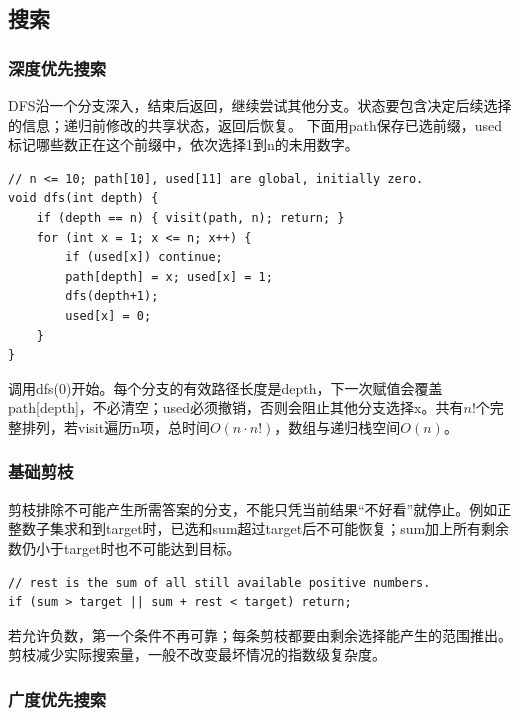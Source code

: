 \documentclass[UTF8,11pt,a4paper,fontset=none]{ctexart}
\begin{document}
\subsection{搜索}
\subsubsection{深度优先搜索}
DFS沿一个分支深入，结束后返回，继续尝试其他分支。状态要包含决定后续选择的信息；递归前修改的共享状态，返回后恢复。
下面用path保存已选前缀，used标记哪些数正在这个前缀中，依次选择1到n的未用数字。
\par\noindent\begin{minipage}{\linewidth}
\begin{lstlisting}
// n <= 10; path[10], used[11] are global, initially zero.
void dfs(int depth) {
    if (depth == n) { visit(path, n); return; }
    for (int x = 1; x <= n; x++) {
        if (used[x]) continue;
        path[depth] = x; used[x] = 1;
        dfs(depth+1);
        used[x] = 0;
    }
}
\end{lstlisting}
\end{minipage}\par
调用dfs(0)开始。每个分支的有效路径长度是depth，下一次赋值会覆盖path[depth]，不必清空；used必须撤销，否则会阻止其他分支选择x。共有$n!$个完整排列，若visit遍历n项，总时间$O(n\cdot n!)$，数组与递归栈空间$O(n)$。
\subsubsection{基础剪枝}
剪枝排除不可能产生所需答案的分支，不能只凭当前结果“不好看”就停止。例如正整数子集求和到target时，已选和sum超过target后不可能恢复；sum加上所有剩余数仍小于target时也不可能达到目标。
\par\noindent\begin{minipage}{\linewidth}
\begin{lstlisting}
// rest is the sum of all still available positive numbers.
if (sum > target || sum + rest < target) return;
\end{lstlisting}
\end{minipage}\par
若允许负数，第一个条件不再可靠；每条剪枝都要由剩余选择能产生的范围推出。剪枝减少实际搜索量，一般不改变最坏情况的指数级复杂度。
\subsubsection{广度优先搜索}
\end{document}
